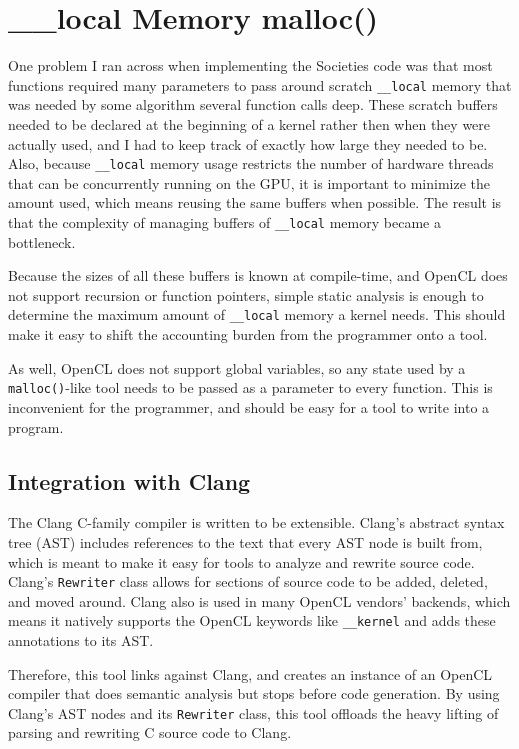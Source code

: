 \documentclass{article}
\begin{document}
\section{\_\_local Memory malloc()}
One problem I ran across when implementing the Societies code was that most functions required many parameters to pass around scratch \texttt{\_\_local} memory that was needed by some algorithm several function calls deep. These scratch buffers needed to be declared at the beginning of a kernel rather then when they were actually used, and I had to keep track of exactly how large they needed to be. Also, because \texttt{\_\_local} memory usage restricts the number of hardware threads that can be concurrently running on the GPU, it is important to minimize the amount used, which means reusing the same buffers when possible. The result is that the complexity of managing buffers of \texttt{\_\_local} memory became a bottleneck.

Because the sizes of all these buffers is known at compile-time, and OpenCL does not support recursion or function pointers, simple static analysis is enough to determine the maximum amount of \texttt{\_\_local} memory a kernel needs. This should make it easy to shift the accounting burden from the programmer onto a tool.

As well, OpenCL does not support global variables, so any state used by a \texttt{malloc()}-like tool needs to be passed as a parameter to every function. This is inconvenient for the programmer, and should be easy for a tool to write into a program.

\subsection{Integration with Clang}
The Clang C-family compiler is written to be extensible. Clang's abstract syntax tree (AST) includes references to the text that every AST node is built from, which is meant to make it easy for tools to analyze and rewrite source code. Clang's \texttt{Rewriter} class allows for sections of source code to be added, deleted, and moved around. Clang also is used in many OpenCL vendors' backends, which means it natively supports the OpenCL keywords like \texttt{\_\_kernel} and adds these annotations to its AST.

Therefore, this tool links against Clang, and creates an instance of an OpenCL compiler that does semantic analysis but stops before code generation. By using Clang's AST nodes and its \texttt{Rewriter} class, this tool offloads the heavy lifting of parsing and rewriting C source code to Clang.
\end{document}
